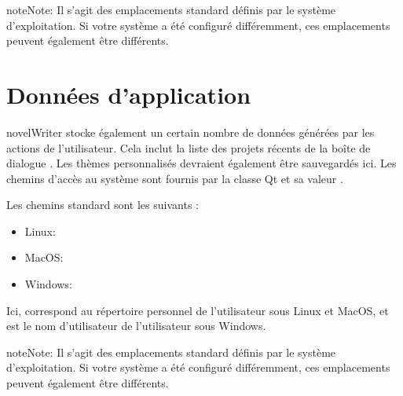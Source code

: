 \documentclass[a4paper,11pt,french]{sphinxmanual}
\begin{document}
\begin{sphinxadmonition}{note}{Note:}
\sphinxAtStartPar
Il s’agit des emplacements standard définis par le système d’exploitation. Si votre système a été configuré différemment, ces emplacements peuvent également être différents.
\end{sphinxadmonition}


\section{Données d’application}
\label{\detokenize{tech_locations:application-data}}\label{\detokenize{tech_locations:a-locations-data}}
\sphinxAtStartPar
novelWriter stocke également un certain nombre de données générées par les actions de l’utilisateur. Cela inclut la liste des projets récents de la boîte de dialogue . Les thèmes personnalisés devraient également être sauvegardés ici. Les chemins d’accès au système sont fournis par la classe Qt  et sa valeur .

\sphinxAtStartPar
Les chemins standard sont les suivants :
\begin{itemize}
\item {} 
\sphinxAtStartPar
Linux: 

\item {} 
\sphinxAtStartPar
MacOS: 

\item {} 
\sphinxAtStartPar
Windows: 

\end{itemize}

\sphinxAtStartPar
Ici, \sphinxcode{\sphinxupquote{\textasciitilde{}}} correspond au répertoire personnel de l’utilisateur sous Linux et MacOS, et  est le nom d’utilisateur de l’utilisateur sous Windows.

\begin{sphinxadmonition}{note}{Note:}
\sphinxAtStartPar
Il s’agit des emplacements standard définis par le système d’exploitation. Si votre système a été configuré différemment, ces emplacements peuvent également être différents.
\end{sphinxadmonition}
\end{document}
